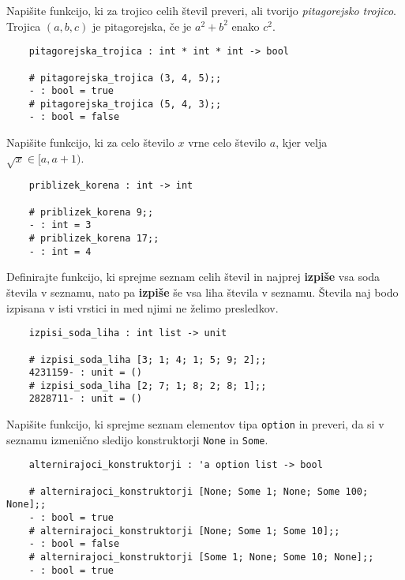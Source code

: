 \documentclass[arhiv]{../izpit}
\begin{document}

\naloga[\tocke{30}]

\podnaloga[\tocke{4}]
Napišite funkcijo, ki za trojico celih števil preveri, ali tvorijo \emph{pitagorejsko trojico}. Trojica $(a, b, c)$ je pitagorejska, če je $a^2 + b^2$ enako $c^2$.
{\small\begin{verbatim}
    pitagorejska_trojica : int * int * int -> bool

    # pitagorejska_trojica (3, 4, 5);;
    - : bool = true
    # pitagorejska_trojica (5, 4, 3);;
    - : bool = false
\end{verbatim}}

\podnaloga[\tocke{5}]
Napišite funkcijo, ki za celo število $x$ vrne celo število $a$, kjer velja $\sqrt{x} \in [a, a+1)$.
{\small\begin{verbatim}
    priblizek_korena : int -> int

    # priblizek_korena 9;;
    - : int = 3
    # priblizek_korena 17;;
    - : int = 4
\end{verbatim}}

\podnaloga[\tocke{7}]
Definirajte funkcijo, ki sprejme seznam celih števil in najprej \textbf{izpiše} vsa soda števila v seznamu, nato pa \textbf{izpiše} še vsa liha števila v seznamu. Števila naj bodo izpisana v isti vrstici in med njimi ne želimo presledkov.
{\small\begin{verbatim}
    izpisi_soda_liha : int list -> unit

    # izpisi_soda_liha [3; 1; 4; 1; 5; 9; 2];;
    4231159- : unit = ()
    # izpisi_soda_liha [2; 7; 1; 8; 2; 8; 1];;
    2828711- : unit = ()

\end{verbatim}}

\podnaloga[\tocke{7}]
Napišite funkcijo, ki sprejme seznam elementov tipa \verb|option| in preveri, da si v seznamu izmenično sledijo konstruktorji \verb|None| in 
\verb|Some|.
{\small\begin{verbatim}
    alternirajoci_konstruktorji : 'a option list -> bool

    # alternirajoci_konstruktorji [None; Some 1; None; Some 100; None];;
    - : bool = true
    # alternirajoci_konstruktorji [None; Some 1; Some 10];;
    - : bool = false
    # alternirajoci_konstruktorji [Some 1; None; Some 10; None];;
    - : bool = true
\end{verbatim}}
\end{document}

